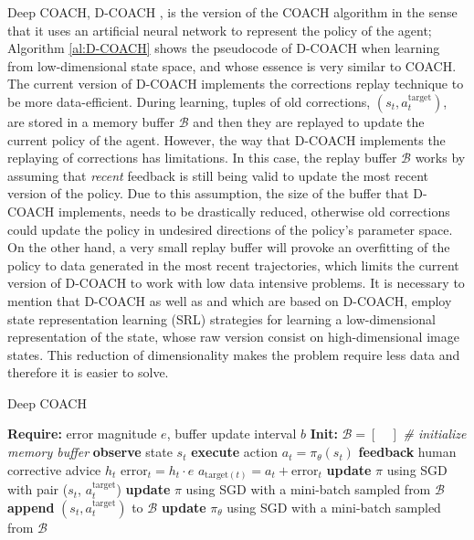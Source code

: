 Deep COACH, D-COACH \cite{D-COACH-Dattari-Celemin-Ruiz-del-Solar-Kober:2018}, is the  version of the COACH algorithm in the sense that it uses an artificial neural network to represent the policy of the agent; Algorithm \ref{al:D-COACH} shows the pseudocode of D-COACH when learning from low-dimensional state space, and whose essence is very similar to COACH. The current version of D-COACH implements the corrections replay technique to be more data-efficient. During learning, tuples of old corrections, $(s_t, a^{\text{target}}_t)$, are stored in a memory buffer $\mathcal{B}$ and then they are replayed to update the current policy of the agent. However, the way that D-COACH implements the replaying of corrections has limitations. In this case, the replay buffer $\mathcal{B}$ works by assuming that \textit{recent} feedback is still being valid to update the most recent version of the policy. Due to this assumption, the size of the buffer that D-COACH implements, needs to be drastically reduced, otherwise old corrections could update the policy in undesired directions of the policy’s parameter space. On the other hand, a very small replay buffer will provoke an overfitting of the policy to data generated in the most recent trajectories, which limits the current version of D-COACH to work with low data intensive problems. It is necessary to mention that D-COACH \cite{D-COACH-Dattari-Celemin-Ruiz-del-Solar-Kober:2018} as well as  \cite{corrections-replay} and \cite{ResearchAssignmentpaper} which are based on D-COACH, employ state representation learning (SRL) strategies for learning a low-dimensional representation of the state, whose raw version consist on high-dimensional image states. This reduction of dimensionality makes the problem require less data and therefore it is easier to solve.




\begin{algorithm}[H]
\caption{Deep COACH}\label{algorithm:DeepCOACH}
\begin{algorithmic}[1]
\State \textbf{Require:} error magnitude $e$, buffer update interval $b$
\State \textbf{Init:} $\mathcal{B} = [\quad]$  \emph{\# initialize memory buffer}
\State \textbf{observe} state $s_{t}$
\State \textbf{execute} action $a_{t}=\pi_{\theta}(s_{t})$
\State \textbf{feedback} human corrective advice $h_{t}$
\State $\text{error}_{t} = h_{t}\cdot e$
\State $a_{\text{target}(t)} = a_{t} + \text{error}_{t}$
\State \textbf{update} $\pi$ using SGD with pair ($s_{t}$, $a^{\text{target}}_{t}$)
\State \textbf{update} $\pi$ using SGD with a mini-batch sampled from $\mathcal{B}$
\State \textbf{append} $(s_{t}, a^{\text{target}}_{t})$ to $\mathcal{B}$
\EndIf
{}
\State \textbf{update} $\pi_{\theta}$ using SGD with a mini-batch sampled from $\mathcal{B}$
\EndIf
\EndFor
\end{algorithmic}
\label{al:D-COACH}
\end{algorithm}


